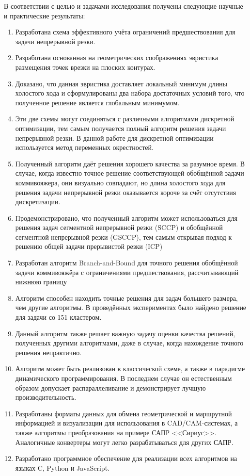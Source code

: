 В соответствии с целью и задачами исследования получены следующие
научные и практические результаты:

\begin{enumerate}
    \item
    Разработана схема эффективного учёта ограничений предшествования для
    задачи непрерывной резки.
    \item
    Разработана основанная на геометрических соображениях эвристика
    размещения точек врезки на плоских контурах.
    \item
    Доказано, что данная эвристика доставляет локальный минимум длины холостого хода
    и сформулированы два набора достаточных условий того,
    что полученное решение является глобальным минимумом.
    \item
    Эти две схемы могут соединяться с различными алгоритмами дискретной оптимизации,
    тем самым получается полный алгоритм решения задачи непрерывной резки.
    В данной работе для дискретной оптимизации используется
    метод переменных окрестностей.
    \item
    Полученный алгоритм даёт решения хорошего качества за разумное время.
    В случае, когда известно точное решение соответствующей обобщённой
    задачи коммивояжера, они визуально совпадают, но длина холостого
    хода для решения задачи непрерывной резки оказывается короче за счёт
    отсутствия дискретизации.
    \item
    Продемонстрировано, что полученный алгоритм может использоваться для
    решения задач сегментной непрерывной резки (SCCP)
    и обобщённой сегментной непрерывной резки (GSCCP),
    тем самым открывая подход к решению общей задачи прерывистой резки
    (ICP)
    \item
    Разработан алгоритм Branch-and-Bound для точного решения
    обобщённой задачи коммивояжёра с ограничениями предшествования,
    рассчитывающий нижнюю границу
    \item
    Алгоритм способен находить точные решения для задач большего размера,
    чем другие алгоритмы.
    В проведённых экспериментах было найдено решение для
    задачи со 151 кластером.
    \item
    Данный алгоритм также решает важную задачу оценки качества
    решений, полученных другими алгоритмами,
    даже в случае, когда нахождение точного решения непрактично.
    \item
    Алгоритм может быть реализован в классической схеме,
    а также в парадигме динамического программирования.
    В последнем случае он естественным образом допускает
    распараллеливание и демонстрирует лучшую производительность.
    \item
    Разработаны форматы данных для обмена геометрической и маршрутной
    информацией и визуализации для использования в CAD/CAM-системах,
    а также алгоритмы преобразования на примере САПР <<Сириус>>.
    Аналогичные конвертеры могут легко разрабатываться для других САПР.
    \item
    Разработано программное обеспечение для реализации всех алгоритмов
    на языках C, Python и JavaScript.
\end{enumerate}

